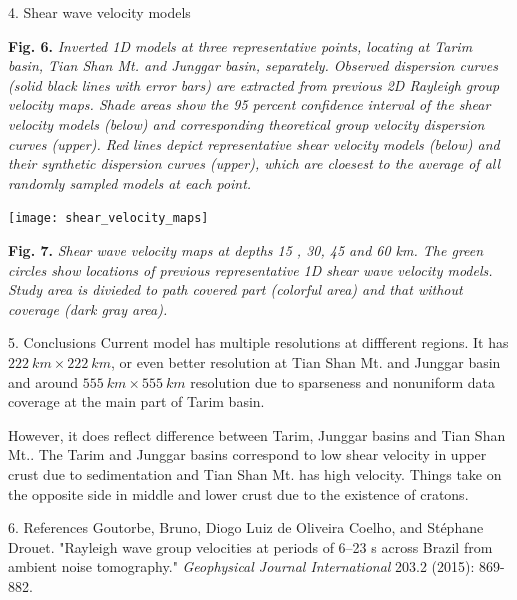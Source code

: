 \documentclass[
    landscape,      %
    paperwidth = 1200mm,
    paperheight = 900mm,
    fontscale = 0.4,
    margin = 1.7cm,
]{baposter}
\begin{document}
\begin{poster}
\begin{posterbox}[column=2 ]{4. Shear wave velocity models}
\begin{center}
\begin{minipage}{0.9\textwidth}
\small
\textbf{Fig. 6.}
\itshape
Inverted 1D models at three representative points, locating at Tarim basin, Tian Shan Mt. and Junggar basin, separately.
Observed dispersion curves (solid black lines with error bars) are extracted from previous 2D Rayleigh group velocity maps.
Shade areas show the 95 percent confidence interval of the shear velocity models (below) and corresponding theoretical
group velocity dispersion curves (upper). Red lines depict representative shear velocity models (below)
and their synthetic dispersion curves (upper), which are cloesest to the average of all randomly sampled models at each point.
\end{minipage}
\end{center}

\begin{center}
\texttt{[image: shear\_velocity\_maps]}
\begin{minipage}{0.9\textwidth}
\footnotesize
\vspace{0.2em}
\textbf{Fig. 7.}
\itshape
 Shear wave velocity maps at depths 15 , 30, 45 and 60 km. The green circles show locations of previous representative 1D shear wave velocity models.
 Study area is divieded to path covered part (colorful area) and that without coverage (dark gray area).

\end{minipage}
\end{center}

\end{posterbox}

\begin{posterbox}[column=2, below=auto]{5. Conclusions}
Current model has multiple resolutions at diffferent regions. It has
$222 \ \textit{km} \times 222 \ \textit{km}$, or even better resolution at
Tian Shan Mt. and Junggar basin and around $555 \ \textit{km} \times 555 \ \textit{km}$ resolution
due to sparseness and nonuniform data coverage at the main part of Tarim basin.

However, it does reflect difference between Tarim, Junggar basins and Tian Shan Mt..
The Tarim and Junggar basins correspond to low shear velocity in upper crust due to sedimentation and
Tian Shan Mt. has high velocity. Things take on the opposite side in middle and lower crust due to the
existence of cratons.
\end{posterbox}

\begin{posterbox}[column=2, below=auto]{6. References}
Goutorbe, Bruno, Diogo Luiz de Oliveira Coelho, and Stéphane Drouet. "Rayleigh wave group velocities at periods of 6–23 s across Brazil from ambient noise tomography." {\itshape Geophysical Journal International} 203.2 (2015): 869-882.
\end{posterbox}

\end{poster}
\end{document}
